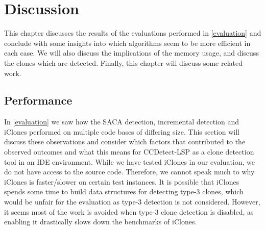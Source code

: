 \chapter{Discussion}
\label{discussion}

This chapter discusses the results of the evaluations performed in \cref{evaluation} and
conclude with some insights into which algorithms seem to be more efficient in each case.
We will also discuss the implications of the memory usage, and discuss the clones which
are detected. Finally, this chapter will discuss some related work.

\section{Performance}

In \cref{evaluation} we saw how the SACA detection, incremental detection and iClones
performed on multiple code bases of differing size. This section will discuss these
observations and consider which factors that contributed to the observed outcomes and what
this means for CCDetect-LSP as a clone detection tool in an IDE environment. While we have
tested iClones in our evaluation, we do not have access to the source code. Therefore, we
cannot speak much to why iClones is faster/slower on certain test instances. It is
possible that iClones spends some time to build data structures for detecting type-3
clones, which would be unfair for the evaluation as type-3 detection is not considered.
However, it seems most of the work is avoided when type-3 clone detection is disabled, as
enabling it drastically slows down the benchmarks of iClones.


